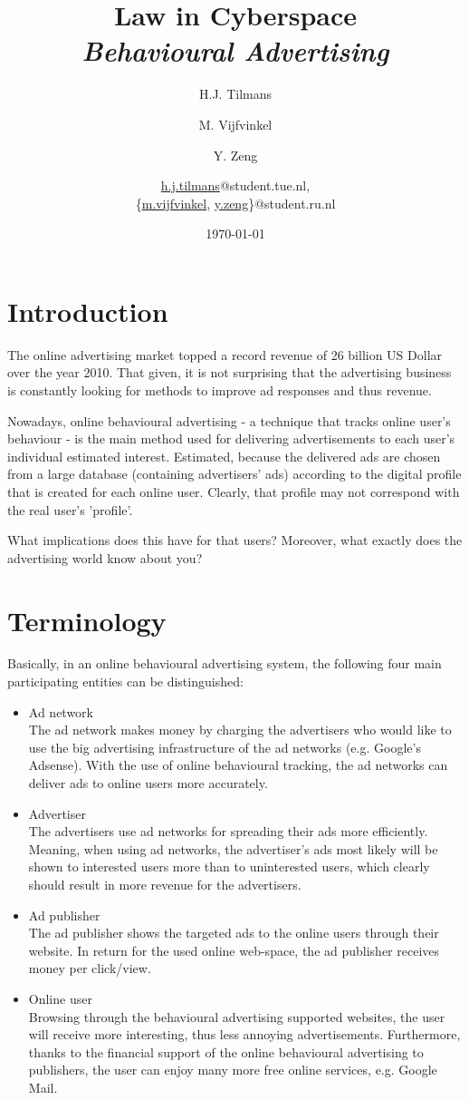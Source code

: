 \documentclass[11pt]{article}
\title{\textbf{Law in Cyberspace\\ \emph{Behavioural Advertising}}}
\author{
	H.J. Tilmans
	\and M. Vijfvinkel
	\and Y. Zeng
	\and
	\href{mailto:h.j.tilmans@student.tue.nl}{h.j.tilmans}@student.tue.nl,\\
	\{\href{mailto:m.vijfvinkel@student.ru.nl}{m.vijfvinkel},
	\href{mailto:y.zeg@student.ru.nl}{y.zeng}\}@student.ru.nl
}
\date{\today}
\newcommand{\oba}{online behavioural advertising }
\begin{document}
\maketitle


\section{Introduction}
The online advertising market topped a record revenue of 26 billion US Dollar over the year 2010. \cite{IAB2011}
That given, it is not surprising that the advertising business is constantly looking for methods to improve ad responses and thus revenue.

Nowadays, \oba - a technique that tracks online user's behaviour - is the main method used for delivering advertisements to each user's individual estimated interest. Estimated, because the delivered ads are chosen from a large database (containing advertisers' ads) according to the digital profile that is created for each online user. Clearly, that profile may not correspond with the real user's 'profile'.

What implications does this have for that users? Moreover, what exactly does the advertising world know about you?

\section{Terminology}
\label{terminology}
Basically, in an \oba system, the following four main participating entities can be distinguished:

\begin{itemize}
	\item Ad network\\
			The ad network makes money by charging the advertisers who would like to use the big advertising infrastructure of the ad networks (e.g. Google's Adsense). With the use of online behavioural tracking, the ad networks can deliver ads to online users more accurately.

	\item Advertiser\\
			The advertisers use ad networks for spreading their ads more efficiently. Meaning, when using ad networks, the advertiser's ads most likely will be shown to interested users more than to uninterested users, which clearly should result in more revenue for the advertisers.

	\item Ad publisher\\
			The ad publisher shows the targeted ads to the online users through their website. In return for the used online web-space, the ad publisher receives money per click/view.

	\item Online user\\
			Browsing through the behavioural advertising supported websites, the user will receive more interesting, thus less annoying advertisements. Furthermore, thanks to the financial support of the \oba to publishers, the user can enjoy many more free online services, e.g. Google Mail. 
\end{itemize}
\end{document}
